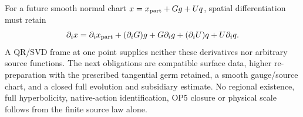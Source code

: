 For a future smooth normal chart
$x=x_{\rm part}+Gg+Uq$, spatial differentiation must retain
\[
 \partial_i x=\partial_i x_{\rm part}+(\partial_iG)g+G\partial_i g
                              +(\partial_iU)q+U\partial_iq.
\]
A QR/SVD frame at one point supplies neither these derivatives nor
arbitrary source functions. The next obligations are compatible surface
data, higher re-preparation with the prescribed tangential germ retained,
a smooth gauge/source chart, and a closed full evolution and subsidiary
estimate. No regional existence, full hyperbolicity, native-action
identification, OP5 closure or physical scale follows from the finite
source law alone.

\clearpage
